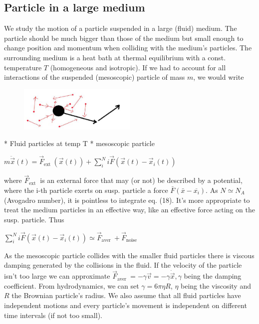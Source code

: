 \subsection*{Particle in a large medium}
We study the motion of a particle suspended in a large (fluid) medium. The
particle should be much bigger than those of the medium but small enough to
change position and momentum when colliding with the medium's particles. The
surrounding medium is a heat bath at thermal equilibrium with a const.
temperature $T$ (homogeneous and isotropic).
If we had to account for all interactions of the suspended (mesoscopic) particle
of mass $m$, we would write
\begin{figure}[htbp]
  \centering
  \includegraphics[width=0.5\textwidth]{graphics/2025_10_17_15d569b79a40ed74679eg-10}
\end{figure}
    * Fluid particles at temp T
    * mesoscopic particle
\begin{DispWithArrows}[displaystyle, format=c]
  $m \ddot{\vec{x}}(t)=\vec{F}_{\text {ext }}(\vec{x}(t))+\sum_{i}^{N} i \vec{F}\left(\vec{x}(t)-\vec{x}_{i}(t)\right)$
\end{DispWithArrows}
where $\vec{F}_{\text {ext }}$ is an external force that may (or not) be
described by a potential, where the i-th particle exerts on susp. particle a
force $\bar{F}\left(\bar{x}-\overline{x_{i}}\right)$. As $N \simeq N_{A}$ (Avogadro number), it is pointless to integrate eq. (18). It's more appropriate
to treat the medium particles in an effective way, like an effective force
acting on the susp. particle. Thus
\begin{DispWithArrows}[displaystyle, format=c]
  $\sum_{i}^{N} i \vec{F}\left(\vec{x}(t)-\vec{x}_{i}(t)\right) \simeq \vec{F}_{\text {aver }}+\vec{F}_{\text {noise }}$
\end{DispWithArrows}
As the mesoscopic particle collides with the smaller fluid particles there is
viscous damping generated by the collisions in the fluid. If the velocity of the
particle isn't too large we can approximate
$\vec{F}_{\text {aver }}=-\gamma \vec{v}=-\gamma \dot{\vec{x}}, \gamma$ being the
damping coefficient. From hydrodynamics, we can set $\gamma=6 \pi \eta R$,
$\eta$ being the viscosity and $R$ the Brownian particle's radius.
We also assume that all fluid particles have independent motions and every
particle's movement is independent on different time intervals (if not too
small).

